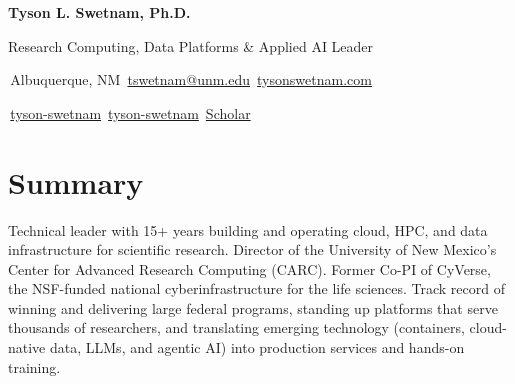 \documentclass[11pt,letterpaper]{article}
\begin{document}
\begin{center}
  {\fontsize{22}{26}\selectfont\bfseries Tyson L. Swetnam, \textmd{Ph.D.}}\par\vspace{4pt}
  {\normalsize Research Computing, Data Platforms \& Applied AI Leader}\par\vspace{5pt}
  {\small
   \faMapMarker*\,Albuquerque, NM \quad
   \faEnvelope[regular]\,\href{mailto:tswetnam@unm.edu}{tswetnam@unm.edu} \quad
   \faGlobe\,\href{https://tysonswetnam.com}{tysonswetnam.com}\par\vspace{2pt}
   \faGithub\,\href{https://github.com/tyson-swetnam}{tyson-swetnam} \quad
   \faLinkedin\,\href{https://www.linkedin.com/in/tyson-swetnam}{tyson-swetnam} \quad
   \faGraduationCap\,\href{https://scholar.google.com/citations?user=HeftZR8AAAAJ}{Scholar}}
\end{center}

\section{Summary}
Technical leader with 15+ years building and operating cloud, HPC, and data infrastructure for scientific research. Director of the University of New Mexico's Center for Advanced Research Computing (CARC). Former Co-PI of CyVerse, the NSF-funded national cyberinfrastructure for the life sciences. Track record of winning and delivering large federal programs, standing up platforms that serve thousands of researchers, and translating emerging technology (containers, cloud-native data, LLMs, and agentic AI) into production services and hands-on training.

\end{document}
